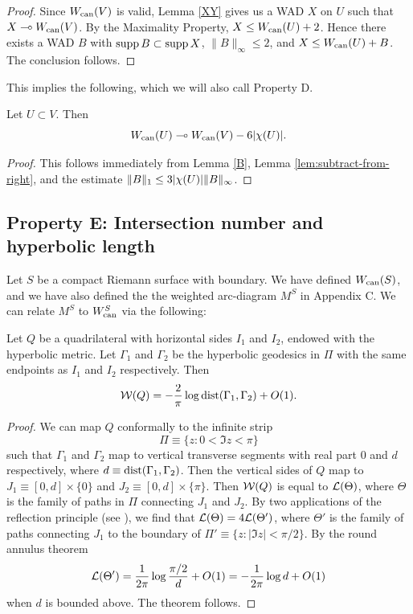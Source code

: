 \begin{proof}
  Since $W_{\mathrm{can}}(V)$ is valid,
 Lemma \ref{XY} gives us a WAD $X$ on $U$ such that $X\multimap W_{\mathrm{can}}(V)$.
 By the Maximality Property, $X\leq W_{\mathrm{can}}(U)+2$. Hence there exists a WAD $B$ with
 $\operatorname{supp} B\subset \operatorname{supp} X$, $\|B\|_\infty\leq 2$,  and $X\leq W_{\mathrm{can}}(U)+B$. The conclusion follows.
\end{proof}



This implies the following, which we will also call Property D. 

\begin{cor}
   Let $U\subset V$. Then
$$
  W_{\mathrm{can}}(U)  \multimap W_{\mathrm{can}}(V)- 6 |\chi(U)|.
$$
\end{cor}
\begin{proof}
This follows immediately from Lemma \ref{B}, Lemma \ref{lem:subtract-from-right}, and the estimate $\Vert B \Vert_1 \le 3|\chi(U)| \Vert B \Vert_\infty$.
\end{proof}
\subsection{Property E: Intersection number and hyperbolic length}
Let $S$ be a compact Riemann surface with boundary. 
We have defined $W_{\operatorname{can}}(S)$, 
and we have also defined the the weighted arc-diagram $M^S$ in Appendix C.
We can relate $M^S$ to $W_{\operatorname{can}}^S$ via the following:

\begin{lem}\label{hyp dist vs mod}
  Let $Q$ be a quadrilateral with horizontal sides $I_1$ and $I_2$,
endowed with the hyperbolic metric.
Let $\Gamma_1$ and $\Gamma_2$ be the hyperbolic geodesics in $\Pi$
with the same endpoints as $I_1$ and $I_2$ respectively.
Then
$$
    {\mathcal W}(Q) = -\frac{2}{\pi} \log \operatorname{dist} (\Gamma_1, \Gamma_2) + O(1).
$$
\end{lem}


\begin{proof}
We can map $Q$ conformally to the infinite strip
$$
\Pi \equiv \{ z : 0 < \Im z < \pi \}
$$
such that $\Gamma_1$ and $\Gamma_2$ map to vertical transverse segments
 with real part 0 and $d$ respectively,
where $d \equiv \operatorname{dist}(\Gamma_1, \Gamma_2)$.
Then the vertical sides of $Q$ map to
 $J_1 \equiv [0,d] \times \{0\}$
 and
 $J_2 \equiv [0, d] \times \{\pi\}$.
Then ${\mathcal W}(Q)$ is equal to ${\mathcal L}(\Theta)$,
where $\Theta$ is the family of paths in $\Pi$ connecting $J_1$ and $J_2$.
By two applications of the reflection principle (see \cite{Ahlfors:quasiconformal}),
we find that ${\mathcal L}(\Theta) = 4 {\mathcal L}(\Theta')$,
where $\Theta'$ is the family of paths connecting $J_1$ to the boundary of
$\Pi' \equiv \{ z : |\Im z| < \pi/2 \}$.
By the round annulus theorem\cite{towers}
$$
{\mathcal L}(\Theta') = \frac{1}{2\pi} \log \frac {\pi/2}d + O(1) = - \frac{1}{2\pi}\log d + O(1)
$$
when $d$ is bounded above.
The theorem follows.
\end{proof}

